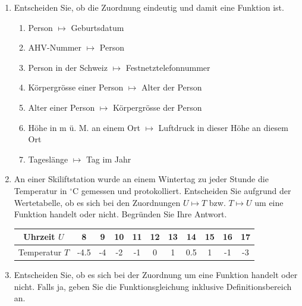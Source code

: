\begin{enumerate}
\begin{multicols}{4}
\begin{enumerate}[label=\roman*)]
{%
                        }
              \end{enumerate}
          \end{multicols}
    \item Entscheiden Sie, ob die Zuordnung eindeutig und damit eine Funktion ist.
          \begin{enumerate}
              \item Person $\mapsto$ Geburtsdatum
              \item AHV-Nummer $\mapsto$ Person
              \item Person in der Schweiz $\mapsto$ Festnetztelefonnummer
              \item Körpergrösse einer Person $\mapsto$ Alter der Person
              \item Alter einer Person $\mapsto$ Körpergrösse der Person
              \item Höhe in m ü. M. an einem Ort $\mapsto$ Luftdruck in dieser Höhe an diesem Ort
              \item Tageslänge $\mapsto$ Tag im Jahr
          \end{enumerate}
    \item An einer Skiliftstation wurde an einem Wintertag zu jeder Stunde die Temperatur in $^\circ$C gemessen und protokolliert.
          Entscheiden Sie aufgrund der Wertetabelle, ob es sich bei den Zuordnungen $U \mapsto T$ bzw. $T \mapsto U$ um eine Funktion handelt oder nicht. Begründen Sie Ihre Antwort.
          \begin{center}
              \begin{tabular}{c|cccccccccc}
                  Uhrzeit $U$    & 8    & 9  & 10 & 11 & 12 & 13 & 14  & 15 & 16 & 17 \\
                  \hline
                  Temperatur $T$ & -4.5 & -4 & -2 & -1 & 0  & 1  & 0.5 & 1  & -1 & -3
              \end{tabular}
          \end{center}
    \item Entscheiden Sie, ob es sich bei der Zuordnung um eine Funktion handelt oder nicht. Falls ja, geben Sie die Funktionsgleichung inklusive Definitionsbereich an.
          \begin{enumerate}

\end{enumerate}
\end{enumerate}
